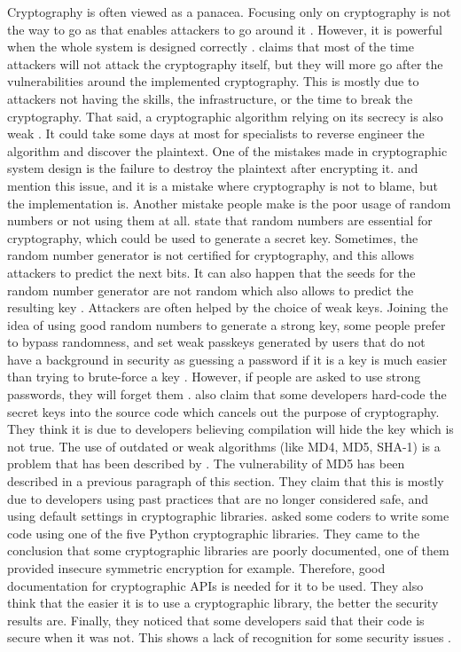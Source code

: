 \documentclass{l4proj}
\begin{document}
Cryptography is often viewed as a panacea. Focusing only on cryptography is not the way to go as that enables attackers to go around it \citep{schneier_security_nodate}.
However, it is powerful when the whole system is designed correctly \citep{schneier_security_nodate}. 
\citet{schneier_security_nodate} claims that most of the time attackers will not attack the cryptography itself, but they will more go after the vulnerabilities around the
implemented cryptography. This is mostly due to attackers not having the skills, the infrastructure, or the time to break the cryptography. 
That said, a cryptographic algorithm relying on its secrecy is also weak \citep{schneier_security_nodate}. It could take some days at most for specialists to reverse engineer 
the algorithm and discover the plaintext. One of the mistakes made in cryptographic system design is the failure to destroy the plaintext after encrypting it. 
\citet{schneier_security_nodate} and \citet{lazar_why_nodate} mention this issue, and it is a mistake where cryptography is not to blame, but the implementation is.
Another mistake people make is the poor usage of random numbers or not using them at all. \citet{lazar_why_nodate} state that random numbers are essential for cryptography, 
which could be used to generate a secret key. Sometimes, the random number generator is not certified for cryptography, and this allows attackers to predict the next bits.
It can also happen that the seeds for the random number generator are not random which also allows to predict the resulting key \citep{lazar_why_nodate}.
Attackers are often helped by the choice of weak keys. Joining the idea of using good random numbers to generate a strong key, some people prefer to bypass randomness,
and set weak passkeys generated by users that do not have a background in security as guessing a password if it is a key is much easier than trying to brute-force a key \citep{schneier_security_nodate}.
However, if people are asked to use strong passwords, they will forget them \citep{schneier_security_nodate}.
\citet{lazar_why_nodate} also claim that some developers hard-code the secret keys into the source code which cancels out the purpose of cryptography.
They think it is due to developers believing compilation will hide the key which is not true.
The use of outdated or weak algorithms (like MD4, MD5, SHA-1) is a problem that has been described by \citet{lazar_why_nodate}.
The vulnerability of MD5 has been described in a previous paragraph of this section.
They claim that this is mostly due to developers using past practices that are no longer considered safe, and using default settings in cryptographic libraries.
\citet{acar_comparing_2017} asked some coders to write some code using one of the five Python cryptographic libraries.
They came to the conclusion that some cryptographic libraries are poorly documented, one of them provided insecure symmetric encryption for example.
Therefore, good documentation for cryptographic APIs is needed for it to be used.
They also think that the easier it is to use a cryptographic library, the better the security results are.
Finally, they noticed that some developers said that their code is secure when it was not. This shows a lack of recognition for some security issues \citep{lazar_why_nodate}.
\end{document}
